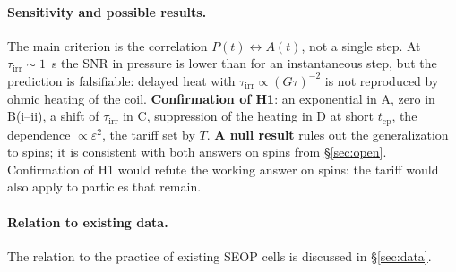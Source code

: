 \documentclass[11pt,a4paper]{article}
\newcommand{\Sref}[1]{\hyperref[#1]{\S\ref{#1}}}
\begin{document}
\paragraph{Sensitivity and possible results.}
The main criterion is the correlation $P(t)\leftrightarrow A(t)$, not a single step. At $\tau_{\mathrm{irr}}\sim 1$~s the SNR in pressure is lower than for an instantaneous step, but the prediction is falsifiable: delayed heat with $\tau_{\mathrm{irr}}\propto(G\tau)^{-2}$ is not reproduced by ohmic heating of the coil. \textbf{Confirmation of H1}: an exponential in A, zero in B(i--ii), a shift of $\tau_{\mathrm{irr}}$ in C, suppression of the heating in D at short $t_{\mathrm{cp}}$, the dependence $\propto\varepsilon^2$, the tariff set by $T$. \textbf{A null result} rules out the generalization to spins; it is consistent with both answers on spins from \Sref{sec:open}. Confirmation of H1 would refute the working answer on spins: the tariff would also apply to particles that remain.
\paragraph{Relation to existing data.}
The relation to the practice of existing SEOP cells is discussed in \Sref{sec:data}.
\end{document}
